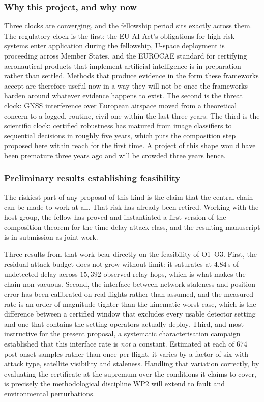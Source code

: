 \documentclass[11pt,a4paper]{article}
\begin{document}
\subsubsection{Why this project, and why now}
Three clocks are converging, and the fellowship period sits exactly across them.
The regulatory clock is the first: the EU AI Act's obligations for high-risk
systems enter application during the fellowship, U-space deployment is proceeding
across Member States, and the EUROCAE standard for certifying aeronautical
products that implement artificial intelligence is in preparation rather than
settled. Methods that produce evidence in the form these frameworks accept are
therefore useful now in a way they will not be once the frameworks harden around
whatever evidence happens to exist. The second is the threat clock: GNSS
interference over European airspace moved from a theoretical concern to a
logged, routine, civil one within the last three years. The third is the
scientific clock: certified robustness has matured from image classifiers to
sequential decisions in roughly five years, which puts the composition step
proposed here within reach for the first time. A project of this shape would
have been premature three years ago and will be crowded three years hence.

\subsubsection{Preliminary results establishing feasibility}
The riskiest part of any proposal of this kind is the claim that the central chain can be made to work at all. That risk has already been retired. Working with the host group, the fellow has proved and instantiated a first version of the composition theorem for the time-delay attack class, and the resulting manuscript is in submission as joint work.

Three results from that work bear directly on the feasibility of O1--O3. First, the residual attack budget does not grow without limit: it saturates at $4.84$\,s of undetected delay across $15{,}392$ observed relay hops, which is what makes the chain non-vacuous. Second, the interface between network staleness and position error has been calibrated on real flights rather than assumed, and the measured rate is an order of magnitude tighter than the kinematic worst case, which is the difference between a certified window that excludes every usable detector setting and one that contains the setting operators actually deploy. Third, and most instructive for the present proposal, a systematic characterisation campaign established that this interface rate is \emph{not} a constant. Estimated at each of $674$ post-onset samples rather than once per flight, it varies by a factor of six with attack type, satellite visibility and staleness. Handling that variation correctly, by evaluating the certificate at the supremum over the conditions it claims to cover, is precisely the methodological discipline WP2 will extend to fault and environmental perturbations.
\end{document}
